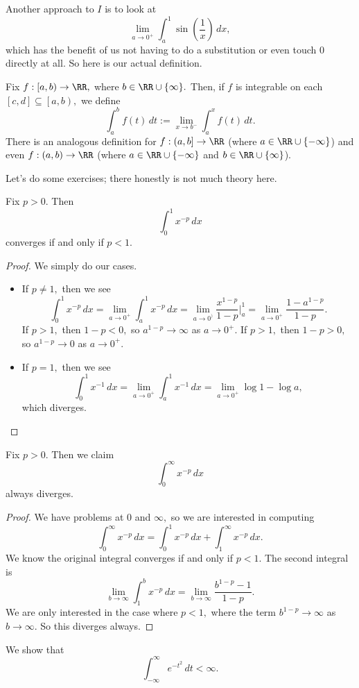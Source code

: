 Another approach to $I$ is to look at
\[\lim_{a\to0^+}\int_a^1\sin\left(\frac1x\right)\,dx,\]
which has the benefit of us not having to do a substitution or even touch $0$ directly at all. So here is our actual definition.
\begin{definition}
	Fix $f:\left[a,b\right)\to\RR,$ where $b\in\RR\cup\{\infty\}.$ Then, if $f$ is integrable on each $[c,d]\subseteq\left[a,b\right),$ we define
	\[\int_a^bf(t)\,dt:=\lim_{x\to b^-}\int_a^xf(t)\,dt.\]
	There is an analogous definition for $f:\left(a,b\right]\to\RR$ (where $a\in\RR\cup\{-\infty\}$) and even $f:(a,b)\to\RR$ (where $a\in\RR\cup\{-\infty\}$ and $b\in\RR\cup\{\infty\}$).
\end{definition}
Let's do some exercises; there honestly is not much theory here.
\begin{exe}[Ross 36.3]
	Fix $p>0.$ Then
	\[\int_0^1x^{-p}\,dx\]
	converges if and only if $p<1.$
\end{exe}
\begin{proof}
	We simply do our cases.
	\begin{itemize}
		\item If $p\ne1,$ then we see
		\[\int_0^1x^{-p}\,dx=\lim_{a\to0^+}\int_a^1x^{-p}\,dx=\lim_{a\to0^)}\frac{x^{1-p}}{1-p}\bigg|_a^1=\lim_{a\to0^+}\frac{1-a^{1-p}}{1-p}.\]
		If $p>1,$ then $1-p<0,$ so $a^{1-p}\to\infty$ as $a\to0^+.$ If $p>1,$ then $1-p>0,$ so $a^{1-p}\to0$ as $a\to0^+.$
		\item If $p=1,$ then we see
		\[\int_0^1x^{-1}\,dx=\lim_{a\to0^+}\int_a^1x^{-1}\,dx=\lim_{a\to0^+}\log1-\log a,\]
		which diverges.
		\qedhere
	\end{itemize}
\end{proof}
\begin{exe}
	Fix $p>0.$ Then we claim
	\[\int_0^\infty x^{-p}\,dx\]
	always diverges.
\end{exe}
\begin{proof}
	We have problems at $0$ and $\infty,$ so we are interested in computing
	\[\int_0^\infty x^{-p}\,dx=\int_0^1x^{-p}\,dx+\int_1^\infty x^{-p}\,dx.\]
	We know the original integral converges if and only if $p<1.$ The second integral is
	\[\lim_{b\to\infty}\int_1^b x^{-p}\,dx=\lim_{b\to\infty}\frac{b^{1-p}-1}{1-p}.\]
	We are only interested in the case where $p<1,$ where the term $b^{1-p}\to\infty$ as $b\to\infty.$ So this diverges always.
\end{proof}
\begin{exe}
	We show that
	\[\int_{-\infty}^\infty e^{-t^2}\,dt<\infty.\]
\end{exe}
